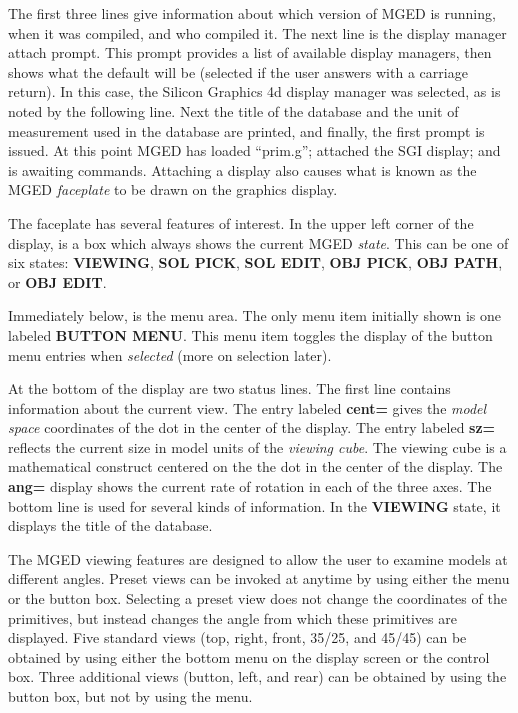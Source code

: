 The first three lines give information about which version of MGED is running,
when it was compiled, and who compiled it.  The next line is the display
manager attach prompt.  This prompt provides a list of available display
managers, then shows what the default will be (selected if the user answers
with a carriage return).  In this case, the Silicon Graphics 4d display
manager was selected, as is noted by the following line.
Next the title of the database and
the unit of measurement used in the database are printed, 
and finally, the first prompt is issued.
At this point MGED has loaded ``prim.g''; attached the SGI display;
and is awaiting commands.  Attaching a display also causes what
is known as the MGED {\sl faceplate} to be drawn on the graphics display.

The faceplate has several features of interest.  In the upper left corner
of the display, is a box which always shows the current MGED {\sl state}.
This can be one of six states:  {\bf VIEWING}, {\bf SOL PICK},
{\bf SOL EDIT}, {\bf OBJ PICK}, {\bf OBJ PATH}, or {\bf OBJ EDIT}.

Immediately below, is the menu area.  The only menu item initially shown is
one labeled {\bf BUTTON MENU}.  This menu item toggles the display of the
button menu entries when {\sl selected} (more on selection later).  

At the bottom of the display are two status lines.  The first line
contains information about the current view.
The entry labeled {\bf cent=} gives the {\sl model space} coordinates 
of the dot in the center of the display.
The entry labeled {\bf sz=} reflects the current size in model units of
the {\sl viewing cube}.  The viewing cube is a mathematical construct
centered on the the dot in the center of the display.  The {\bf ang=}
display shows the current rate of rotation in each of the three axes.
The bottom line is used for several kinds of information.
In the {\bf VIEWING} state, it displays the title of the database.

The MGED viewing features are designed to allow the user to examine
models at different angles.
Preset views can be invoked at 
anytime by using either the menu or the button box.
Selecting a preset view does
not change the coordinates of the primitives,
but instead changes the angle from which these primitives are
displayed.  Five standard views (top, right, front, 35/25, and 45/45) can 
be obtained by using either the bottom menu on the display screen or the 
control box.
Three additional views (button, left, and rear) can be obtained
by using the button box, but not by using the menu.

